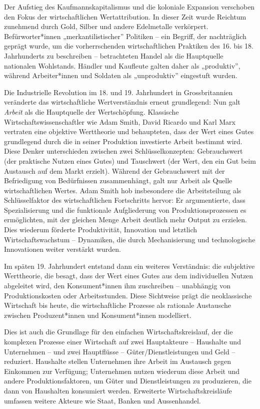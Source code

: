 \documentclass[
  nswissgerman,
  a4paper,
  DIV=11,
  numbers=noendperiod,
  oneside,
  openany]{scrreprt}
\begin{document}
Der Aufstieg des Kaufmannskapitalismus und die koloniale Expansion
verschoben den Fokus der wirtschaftlichen Wertattribution. In dieser
Zeit wurde Reichtum zunehmend durch Gold, Silber und andere Edelmetalle
verkörpert. Befürworter*innen „merkantilistischer'' Politiken -- ein
Begriff, der nachträglich geprägt wurde, um die vorherrschenden
wirtschaftlichen Praktiken des 16. bis 18. Jahrhunderts zu beschreiben
-- betrachteten Handel als die Hauptquelle nationalen Wohlstands.
Händler und Kaufleute galten daher als „produktiv'', während
Arbeiter*innen und Soldaten als „unproduktiv'' eingestuft wurden.

Die Industrielle Revolution im 18. und 19. Jahrhundert in
Grossbritannien veränderte das wirtschaftliche Wertverständnis erneut
grundlegend: Nun galt \emph{Arbeit} als die Hauptquelle der
Wertschöpfung. Klassische Wirtschaftswissenschaftler wie Adam Smith,
David Ricardo und Karl Marx vertraten eine objektive Werttheorie und
behaupteten, dass der Wert eines Gutes grundlegend durch die in seiner
Produktion investierte Arbeit bestimmt wird. Diese Denker unterschieden
zwischen zwei Schlüsselkonzepten: Gebrauchswert (der praktische Nutzen
eines Gutes) und Tauschwert (der Wert, den ein Gut beim Austausch auf
dem Markt erzielt). Während der Gebrauchswert mit der Befriedigung von
Bedürfnissen zusammenhängt, galt nur Arbeit als Quelle wirtschaftlichen
Wertes. Adam Smith hob insbesondere die Arbeitsteilung als
Schlüsselfaktor des wirtschaftlichen Fortschritts hervor: Er
argumentierte, dass Spezialisierung und die funktionale Aufgliederung
von Produktionsprozessen es ermöglichten, mit der gleichen Menge Arbeit
deutlich mehr Output zu erzielen. Dies wiederum förderte Produktivität,
Innovation und letztlich Wirtschaftswachstum -- Dynamiken, die durch
Mechanisierung und technologische Innovationen weiter verstärkt wurden.

Im späten 19. Jahrhundert entstand dann ein weiteres Verständnis: die
subjektive Werttheorie, die besagt, dass der Wert eines Gutes aus dem
individuellen Nutzen abgeleitet wird, den Konsument*innen ihm
zuschreiben -- unabhängig von Produktionskosten oder Arbeitsstunden.
Diese Sichtweise prägt die neoklassische Wirtschaft bis heute, die
wirtschaftliche Prozesse als rationale Austausche zwischen
Produzent*innen und Konsument*innen modelliert.

Dies ist auch die Grundlage für den einfachen Wirtschaftskreislauf, der
die komplexen Prozesse einer Wirtschaft auf zwei Hauptakteure --
Haushalte und Unternehmen -- und zwei Hauptflüsse --
Güter/Dienstleistungen und Geld -- reduziert. Haushalte stellen
Unternehmen ihre Arbeit im Austausch gegen Einkommen zur Verfügung;
Unternehmen nutzen wiederum diese Arbeit und andere Produktionsfaktoren,
um Güter und Dienstleistungen zu produzieren, die dann von Haushalten
konsumiert werden. Erweiterte Wirtschaftskreisläufe umfassen weitere
Akteure wie Staat, Banken und Aussenhandel.
\end{document}
